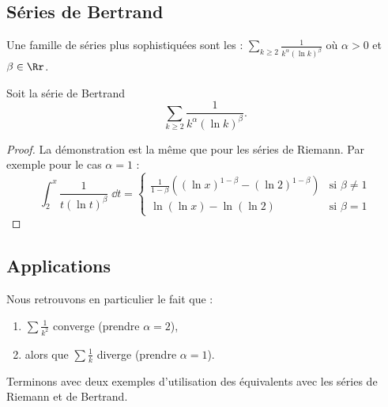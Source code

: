 \documentclass[class=report,crop=false]{standalone}
\begin{document}
\subsection{Séries de Bertrand}


Une famille de séries plus sophistiquées sont les  : 
$\sum_{k\ge2} \frac{1}{k^\alpha(\ln k)^\beta}$
où $\alpha > 0$ et $\beta \in \Rr$.

\begin{proposition}
Soit la série de Bertrand 
$$\sum_{k\ge2} \frac{1}{k^\alpha(\ln k)^\beta}.$$

\end{proposition}


\begin{proof}
La démonstration est la même que pour les séries de Riemann.
Par exemple pour le cas $\alpha=1$ : 
$$
\int_2^{x} \frac{1}{t(\ln t)^{\beta}}\;\dd t =
\left\{\begin{array}{ll}
\displaystyle{\frac{1}{1-\beta}\left((\ln x)^{1-\beta}-(\ln 2)^{1-\beta}\right)}&\text{si }\beta\neq
    1\\[1.5ex]
\ln(\ln x)-\ln(\ln 2) &\text{si }\beta=1
\end{array}\right. 
$$
\end{proof}


\subsection{Applications}


Nous retrouvons en particulier le fait que :
\begin{enumerate}
  \item $\sum \frac{1}{k^2}$ converge (prendre $\alpha=2$),
  
  \item alors que $\sum \frac{1}{k}$ diverge (prendre $\alpha=1$). 
\end{enumerate}



\bigskip

Terminons avec deux exemples d'utilisation des équivalents 
avec les séries de Riemann et de Bertrand.
\end{document}
